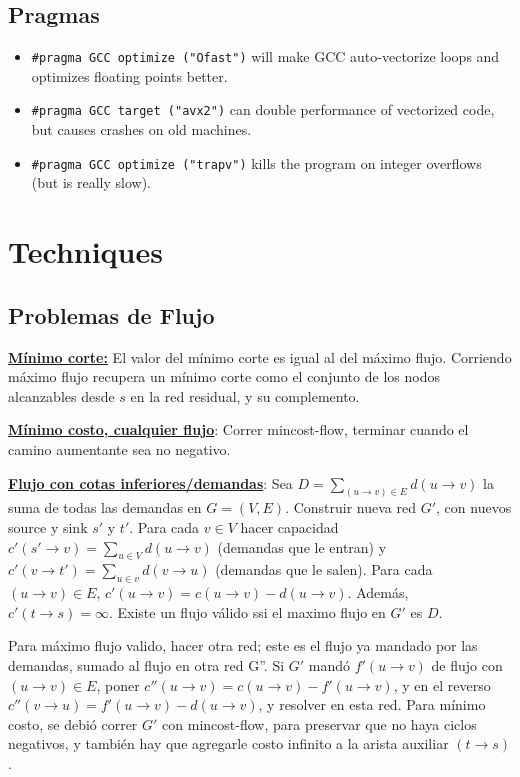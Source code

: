 	\subsection{Pragmas}
		\begin{itemize}
			\item \lstinline{#pragma GCC optimize ("Ofast")} will make GCC auto-vectorize loops and optimizes floating points better.
			\item \lstinline{#pragma GCC target ("avx2")} can double performance of vectorized code, but causes crashes on old machines.
			\item \lstinline{#pragma GCC optimize ("trapv")} kills the program on integer overflows (but is really slow).
		\end{itemize}
	
\section{Techniques}
\subsection{Problemas de Flujo}

\ul{\textbf{Mínimo corte:}} El valor del mínimo corte es igual al del máximo flujo. Corriendo máximo flujo recupera un mínimo corte como el conjunto de los nodos alcanzables desde $s$ en la red residual, y su complemento.

\ul{\textbf{Mínimo costo, cualquier flujo}}: Correr mincost-flow, terminar cuando el camino aumentante sea no negativo.
    
\ul{\textbf{Flujo con cotas inferiores/demandas}}: Sea $D = \sum_{(u\to v)\in E} d(u\to v)$ la suma de todas las demandas en $G = (V, E)$. Construir nueva red $G'$, con nuevos source y sink $s'$ y $t'$. Para cada $v \in V$ hacer capacidad $c'(s' \to v) = \sum_{u \in V} d(u\to v)$ (demandas que le entran) y $c'(v \to t') = \sum_{u \in v} d(v \to u)$ (demandas que le salen). Para cada $(u \to v) \in E$, $c'(u \to v) = c(u\to v) - d(u\to v)$. Adem\'as, $c'(t \to s) = \infty$. Existe un flujo válido ssi el maximo flujo en $G'$ es $D$.

Para máximo flujo valido, hacer otra red; este es el flujo ya mandado por las demandas, sumado al flujo en otra red G''. Si $G'$ mandó $f'(u\to v)$ de flujo con $(u \to v) \in E$,  poner $c''(u \to v) = c(u \to v) - f'(u \to v)$, y en el reverso $c''(v \to u) = f'(u\to v) - d(u \to v)$, y resolver en esta red. Para m\'inimo costo, se debi\'o correr $G'$ con mincost-flow, para preservar que no haya ciclos negativos, y también hay que agregarle costo infinito a la arista auxiliar $(t \to s)$.
    
